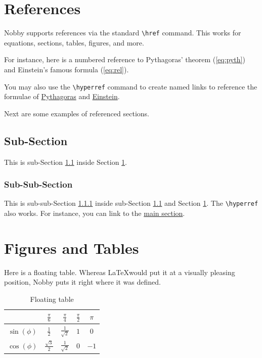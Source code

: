 \documentclass[10pt]{article}
\begin{document}
\section{References}
\label{sec:ref}
Nobby supports references via the standard \texttt{\textbackslash{href}}
command. This works for equations, sections, tables, figures, and
more.

For instance, here is a numbered reference to Pythagoras' theorem
(\ref{eq:pyth}) and Einstein's famous formula (\ref{eq:rel}).

You may also use the \texttt{\textbackslash{hyperref}} command to
create named links to reference the formulae of
\hyperref[eq:pyth]{Pythagoras} and \hyperref[eq:rel]{Einstein}.

Next are some examples of referenced sections.

\subsection{Sub-Section}
\label{ss:1}
This is sub-Section \ref{ss:1} inside Section \ref{sec:ref}.

\subsubsection{Sub-Sub-Section}
\label{sss:1}
This is sub-sub-Section \ref{sss:1} inside sub-Section \ref{ss:1} and
Section \ref{sec:ref}. The \texttt{\textbackslash{hyperref}} also
works. For instance, you can link to the \hyperref[sec:ref]{main section}.

\section{Figures and Tables}
Here is a floating table. Whereas  \LaTeX would put it at a visually
pleasing position, Nobby puts it right where it was defined.
\begin{table}
  \centering
  \begin{tabular}{c | c c c c}
    & $\frac{\pi}{6}$& $\frac{\pi}{4}$& $\frac{\pi}{2}$ & $\pi$\\[1mm]
    \hline
    \rule{0cm}{4mm}$\sin(\phi)$& $\frac{1}{2}$ & $\frac{1}{\sqrt{2}}$& $1$ & $0$\\
    \rule{0cm}{4mm}$\cos(\phi)$& $\frac{\sqrt{3}}{2}$ & $\frac{1}{\sqrt{2}}$& $0$&$-1$
  \end{tabular}
  \caption{Floating table}
\end{table}
\end{document}
